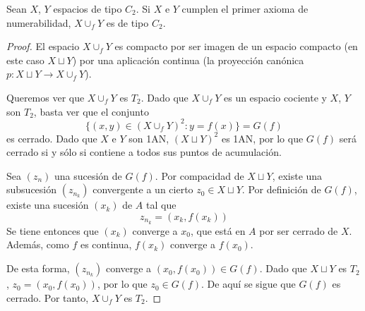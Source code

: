 
\begin{lemma}
\label{AdjC2} Sean $X$, $Y$ espacios de tipo $C_2$. Si $X$ e $Y$ cumplen el primer axioma de numerabilidad, $X\cup_f Y$ es de tipo $C_2$.
\end{lemma}

\begin{proof}
El espacio $X\cup_f Y$ es compacto por ser imagen de un espacio compacto
(en este caso $X\sqcup Y$) por una aplicación continua (la proyección
canónica $p\colon X\sqcup Y \to X\cup_f Y$).

Queremos ver que $X\cup_f Y$ es $T_2$. Dado que $X\cup_f Y$ es un espacio
cociente y $X$, $Y$ son $T_2$, basta ver que el conjunto
\[\{(x,y) \in (X\cup_f Y)^2\colon y=f(x)\}=G(f)\]
es cerrado. Dado que $X$ e $Y$ son 1AN, $(X\sqcup Y)^2$ es 1AN, por lo que
$G(f)$ será cerrado si y sólo si contiene a todos sus puntos de acumulación.


Sea $(z_n)$ una sucesión de $G(f)$. Por compacidad de $X \sqcup Y$, existe
una subsucesión $(z_{n_k})$ convergente a un cierto $z_0 \in X\sqcup Y$. Por
definición de $G(f)$, existe una sucesión $(x_k)$ de $A$ tal que
\[z_{n_k}=(x_k,f(x_k))\]
Se tiene entonces que $(x_k)$ converge a $x_0$, que está en $A$ por ser
cerrado de $X$. Además, como $f$ es continua, $f(x_k)$ converge a $f(x_0)$.

De esta forma, $(z_{n_k})$ converge a $(x_0,f(x_0)) \in G(f)$. Dado que
$X\sqcup Y$ es $T_2$, $z_0=(x_0,f(x_0))$, por lo que $z_0 \in G(f)$. De aquí
se sigue que $G(f)$ es cerrado. Por tanto, $X\cup_f Y$ es $T_2$.
\end{proof}

